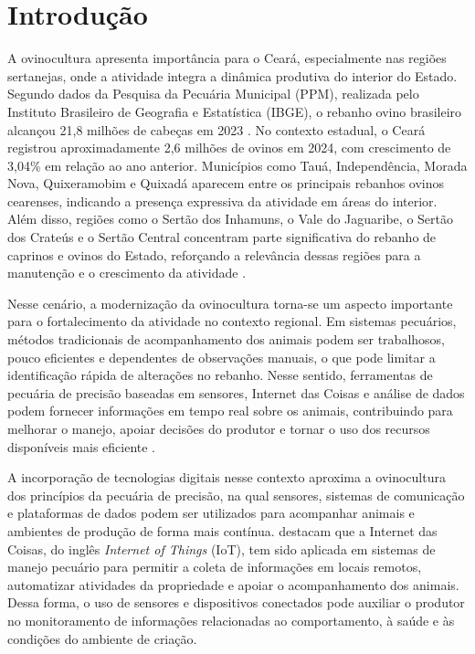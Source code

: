 \chapter{Introdução}
\label{cap:introducao}

A ovinocultura apresenta importância para o Ceará, especialmente nas regiões sertanejas, onde a atividade integra a dinâmica produtiva do interior do Estado. Segundo dados da Pesquisa da Pecuária Municipal (PPM), realizada pelo Instituto Brasileiro de Geografia e Estatística (IBGE), o rebanho ovino brasileiro alcançou 21,8 milhões de cabeças em 2023 \cite{ibge2024}. No contexto estadual, o Ceará registrou aproximadamente 2,6 milhões de ovinos em 2024, com crescimento de 3,04\% em relação ao ano anterior. Municípios como Tauá, Independência, Morada Nova, Quixeramobim e Quixadá aparecem entre os principais rebanhos ovinos cearenses, indicando a presença expressiva da atividade em áreas do interior. Além disso, regiões como o Sertão dos Inhamuns, o Vale do Jaguaribe, o Sertão dos Crateús e o Sertão Central concentram parte significativa do rebanho de caprinos e ovinos do Estado, reforçando a relevância dessas regiões para a manutenção e o crescimento da atividade \cite{ceara2025}.

Nesse cenário, a modernização da ovinocultura torna-se um aspecto importante para o fortalecimento da atividade no contexto regional. Em sistemas pecuários, métodos tradicionais de acompanhamento dos animais podem ser trabalhosos, pouco eficientes e dependentes de observações manuais, o que pode limitar a identificação rápida de alterações no rebanho. Nesse sentido, ferramentas de pecuária de precisão baseadas em sensores, Internet das Coisas e análise de dados podem fornecer informações em tempo real sobre os animais, contribuindo para melhorar o manejo, apoiar decisões do produtor e tornar o uso dos recursos disponíveis mais eficiente \cite{bhaskaran2024}.


A incorporação de tecnologias digitais nesse contexto aproxima a ovinocultura dos princípios da pecuária de precisão, na qual sensores, sistemas de comunicação e plataformas de dados podem ser utilizados para acompanhar animais e ambientes de produção de forma mais contínua.  destacam que a Internet das Coisas, do inglês \textit{Internet of Things} (IoT), tem sido aplicada em sistemas de manejo pecuário para permitir a coleta de informações em locais remotos, automatizar atividades da propriedade e apoiar o acompanhamento dos animais. Dessa forma, o uso de sensores e dispositivos conectados pode auxiliar o produtor no monitoramento de informações relacionadas ao comportamento, à saúde e às condições do ambiente de criação.


